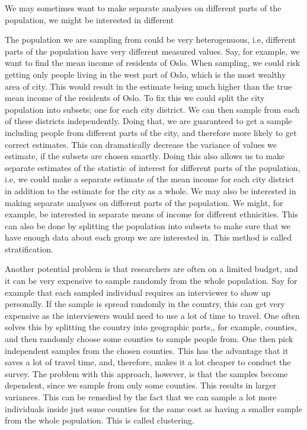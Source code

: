 \documentclass{article}
\begin{document}
We may sometimes want to make separate analyses on different parts of the
population, we might be interested in different

The population we are sampling from could be very heterogenuous, i.e, different
parts of the population have very different measured values. Say, for example, we want
to find the mean income of residents of Oslo. When sampling, we could risk
getting only people living in the west part of Oslo, which is the most wealthy
area of city. This would result in the estimate being much higher than the true
mean income of the residents of Oslo. To fix this we could split
the city population into subsets; one for each city district. We can then sample
from each of these districts independently. Doing that, we are guaranteed to get
a sample including people from different parts of the city, and therefore
more likely to get correct estimates. This can dramatically decrease the
variance of values we estimate, if the subsets are chosen smartly. Doing this also allows us to make
separate estimates of the statistic of interest for different parts of the
population, i.e, we could make a separate estimate of the mean income for each city
district in addition to the estimate for the city as a whole. We may also be
interested in making separate analyses on different parts of the population. We
might, for example, be interested in separate means of income for different
ethnicities. This can also be done by splitting the population into subsets to
make sure that we have enough data about each group we are interested in. This method is
called stratification.


Another potential problem is that researchers are often on a limited budget, and
it can be very expensive to sample randomly from the whole population. Say
for example that 
each sampled individual requires an interviewer to show up personally. If the sample is spread randomly in the country, this can get very
expensive as the interviewers would need to use a lot of time to travel. One often solves
this by splitting the country into geographic parts,, for example, counties, and
then randomly choose some counties to sample people from. One then pick
independent samples from the chosen counties. This has the advantage that it
saves a lot of travel time, and, therefore, makes it a lot cheaper to conduct the
survey. The problem with this approach, however, is that the samples become
dependent, since we sample from only some counties. This results in larger
variances. This can be remedied by the fact that we can sample a lot more
individuals inside just some counties for the same
cost as having a smaller sample from the whole
population. This is called clustering.
\end{document}

